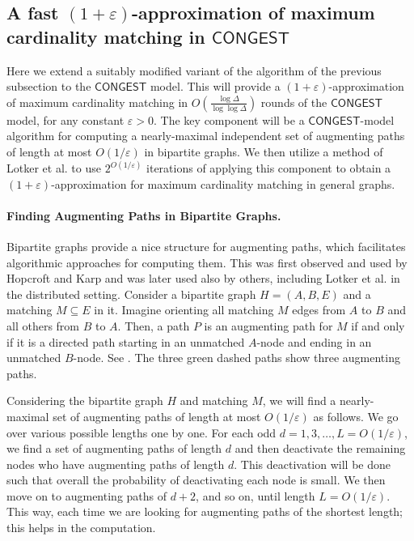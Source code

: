 \documentclass[11pt]{article}
\newcommand{\eps}{\varepsilon}
\begin{document}
\subsection{A fast $(1+\eps)$-approximation of maximum cardinality matching in $\mathsf{CONGEST}$}
\label{sec:1epsMMCONGEST}
Here we extend a suitably modified variant of the algorithm of the previous subsection to the $\mathsf{CONGEST}$ model. This will provide a $(1+\eps)$-approximation of maximum cardinality matching in $O(\frac{\log \Delta}{\log\log \Delta})$ rounds of the $\mathsf{CONGEST}$ model, for any constant $\eps>0$. The key component will be a $\mathsf{CONGEST}$-model algorithm for computing a nearly-maximal independent set of augmenting paths of length at most $O(1/\eps)$ in bipartite graphs. We then utilize a method of Lotker et al.\cite{lotkerMatchingImproved} to use $2^{O(1/\eps)}$ iterations of applying this component to obtain a $(1+\eps)$-approximation for maximum cardinality matching in general graphs.

\paragraph{Finding Augmenting Paths in Bipartite Graphs.}
Bipartite graphs provide a nice structure for augmenting paths, which facilitates algorithmic approaches for computing them. This was first observed and used by Hopcroft and Karp\cite{HopcroftKarp1973} and was later used also by others, including Lotker et al.\cite{lotkerMatchingImproved} in the distributed setting. Consider a bipartite graph $H=(A, B, E)$ and a matching $M\subseteq E$ in it. Imagine orienting all matching $M$ edges from $A$ to $B$ and all others from $B$ to $A$. Then, a path $P$ is an augmenting path for $M$ if and only if it is a directed path starting in an unmatched $A$-node and ending in an unmatched $B$-node. See . The three green dashed paths show three augmenting paths.

Considering the bipartite graph $H$ and matching $M$, we will find a nearly-maximal set of augmenting paths of length at most $O(1/\eps)$ as follows. We go over various possible lengths one by one. For each odd $d= 1, 3, \dots, L=O(1/\eps)$, we find a set of augmenting paths of length $d$ and then deactivate the remaining nodes who have augmenting paths of length $d$. This deactivation will be done such that overall the probability of deactivating each node is small. We then move on to augmenting paths of $d+2$, and so on, until length $L=O(1/\eps)$. This way, each time we are looking for augmenting paths of the shortest length; this helps in the computation.
\end{document}
